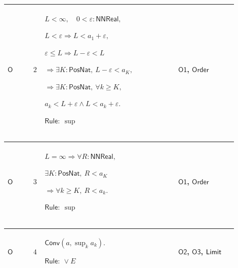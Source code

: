 \documentclass[12pt,reqno]{amsart}
\theoremstyle{blueplain}
\numberwithin{equation}{section}
\begin{document}
{\scriptsize \setlength{\parskip}{0pt}\nointerlineskip
\noindent 
\begin{tabular}{|@{}>{\centering\arraybackslash}m{0.10658\linewidth}|>{\centering\arraybackslash}m{0.03553\linewidth}|>{\centering\arraybackslash}m{0.52105\linewidth}|>{\centering\arraybackslash}m{0.23684\linewidth}|}
\hline
\hypertarget{proof:O2}{$\displaystyle \mathsf{O}$} & $\displaystyle 2$ & $%
\displaystyle L<\infty,\quad0<\varepsilon:\mathsf{NNReal},$\par$%
\displaystyle L<\varepsilon\Rightarrow L<a_1+\varepsilon,$\par$\displaystyle %
\varepsilon\le L\Rightarrow L-\varepsilon<L$\par$\displaystyle %
\Rightarrow\exists K:\mathsf{PosNat},\ L-\varepsilon<a_K,$\par$\displaystyle %
\Rightarrow\exists K:\mathsf{PosNat},\ \forall k\ge K,$\par$\displaystyle %
a_k<L+\varepsilon\land L<a_k+\varepsilon.$\par$\displaystyle \mathsf{Rule}:\
\sup$ & \hyperlink{proof:O1}{$\displaystyle \mathsf{O1}$}, \hyperlink{ax:Order}%
{$\displaystyle \mathsf{Order}$} \\ \hline
\end{tabular}%
}

{\scriptsize \setlength{\parskip}{0pt}\nointerlineskip
\noindent 
\begin{tabular}{|@{}>{\centering\arraybackslash}m{0.10658\linewidth}|>{\centering\arraybackslash}m{0.03553\linewidth}|>{\centering\arraybackslash}m{0.52105\linewidth}|>{\centering\arraybackslash}m{0.23684\linewidth}|}
\hline
\hypertarget{proof:O3}{$\displaystyle \mathsf{O}$} & $\displaystyle 3$ & $%
\displaystyle L=\infty\Rightarrow\forall R:\mathsf{NNReal},$\par$%
\displaystyle \exists K:\mathsf{PosNat},\ R<a_K$\par$\displaystyle %
\Rightarrow\forall k\ge K,\ R<a_k.$\par$\displaystyle \mathsf{Rule}:\ \sup$
& \hyperlink{proof:O1}{$\displaystyle \mathsf{O1}$}, \hyperlink{ax:Order}{$%
\displaystyle \mathsf{Order}$} \\ \hline
\end{tabular}%
}

{\scriptsize \setlength{\parskip}{0pt}\nointerlineskip
\noindent 
\begin{tabular}{|@{}>{\centering\arraybackslash}m{0.10658\linewidth}|>{\centering\arraybackslash}m{0.03553\linewidth}|>{\centering\arraybackslash}m{0.52105\linewidth}|>{\centering\arraybackslash}m{0.23684\linewidth}|}
\hline
\hypertarget{proof:O4}{$\displaystyle \mathsf{O}$} & $\displaystyle 4$ & $%
\displaystyle \mathsf{Conv}(a,\sup_k a_k).$\par$\displaystyle \mathsf{Rule}%
:\ \lor E$ & \hyperlink{proof:O2}{$\displaystyle \mathsf{O2}$}, \hyperlink{proof:O3}%
{$\displaystyle \mathsf{O3}$}, \hyperlink{def:Limit}{$\displaystyle \mathsf{%
Limit}$} \\ \hline
\end{tabular}%
}
\end{document}
